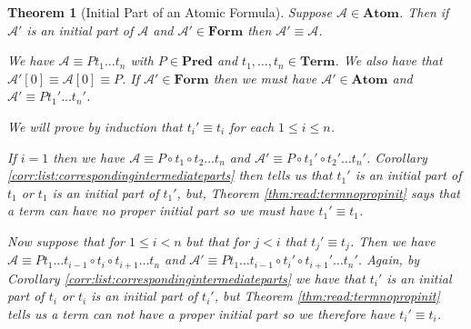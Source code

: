 \documentclass[12pt]{article}
\theoremstyle{break}
\theoremstyle{break}
\newtheorem{theorem}{Theorem}[section]
\theoremstyle{break}
\theoremstyle{break}
\theoremstyle{break}
\newtheorem{informal definition}[definition]{Informal Definition}
\newcommand{\mc}[1]{\mathcal{#1}}
\begin{document}
\begin{theorem}[Initial Part of an Atomic Formula]
\label{thm:read:initpartatom}
Suppose $\mc{A}\in\textbf{Atom}$.
Then if $\mc{A}'$ is an initial part of $\mc{A}$ and $\mc{A}'\in\textbf{Form}$ then $\mc{A}' \equiv \mc{A}$.

We have $\mc{A} \equiv Pt_1\ldots t_n$ with $P\in \textbf{Pred}$ and $t_1,\ldots, t_n\in\textbf{Term}$.
We also have that $\mc{A}'[0] \equiv \mc{A}[0] \equiv P$.
If $\mc{A}'\in\textbf{Form}$ then we must have $\mc{A}'\in\textbf{Atom}$ and $\mc{A}' \equiv Pt_1'\ldots t_n'$.

We will prove by induction that $t_i' \equiv t_i$ for each $1\le i \le n$.

If $i=1$ then we have $\mc{A} \equiv P \circ t_1 \circ t_2\ldots t_n$ and $\mc{A}' \equiv P \circ t_1' \circ t_2'\ldots t_n'$.
Corollary \ref{corr:list:correspondingintermediateparts} then tells us that $t_1'$ is an initial part of $t_1$ or $t_1$ is an initial part of $t_1'$, but, Theorem \ref{thm:read:termnopropinit} says that a term can have no proper initial part so we must have $t_1'\equiv t_1$.

Now suppose that for $1 \le i < n$ but that for $j < i$ that $t_j' \equiv t_j$.
Then we have $\mc{A}\equiv P t_1\ldots t_{i-1} \circ t_i \circ t_{i+1} \ldots t_n$ and $\mc{A}' \equiv P t_1 \ldots t_{i-1} \circ t_i' \circ t_{i+1}' \ldots t_n'$.
Again, by Corollary \ref{corr:list:correspondingintermediateparts} we have that $t_i'$ is an initial part of $t_i$ or $t_i$ is an initial part of $t_i'$, but Theorem \ref{thm:read:termnopropinit} tells us a term can not have a proper initial part so we therefore have $t_i' \equiv t_i$.
\end{theorem}
\end{document}
